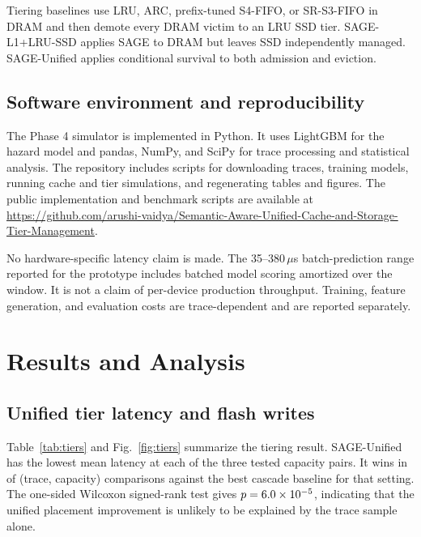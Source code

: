 \documentclass[conference]{IEEEtran}
\newcommand{\us}{\ensuremath{\mu}s}
\begin{document}
Tiering baselines use LRU, ARC, prefix-tuned S4-FIFO, or SR-S3-FIFO in DRAM and then demote every DRAM victim to an LRU SSD tier. SAGE-L1+LRU-SSD applies SAGE to DRAM but leaves SSD independently managed. SAGE-Unified applies conditional survival to both admission and eviction.

\subsection{Software environment and reproducibility}
The Phase 4 simulator is implemented in Python. It uses LightGBM for the hazard model and pandas, NumPy, and SciPy for trace processing and statistical analysis. The repository includes scripts for downloading traces, training models, running cache and tier simulations, and regenerating tables and figures. The public implementation and benchmark scripts are available at
\url{https://github.com/arushi-vaidya/Semantic-Aware-Unified-Cache-and-Storage-Tier-Management}.

No hardware-specific latency claim is made. The 35--380\,\us{} batch-prediction range reported for the prototype includes batched model scoring amortized over the window. It is not a claim of per-device production throughput. Training, feature generation, and evaluation costs are trace-dependent and are reported separately.

\section{Results and Analysis}
\subsection{Unified tier latency and flash writes}
Table~\ref{tab:tiers} and Fig.~\ref{fig:tiers} summarize the tiering result. SAGE-Unified has the lowest mean latency at each of the three tested capacity pairs. It wins in \tierWins{} of \tierN{} (trace, capacity) comparisons against the best cascade baseline for that setting. The one-sided Wilcoxon signed-rank test gives $p=6.0\times 10^{-5}$, indicating that the unified placement improvement is unlikely to be explained by the trace sample alone.

\begin{table}[t]
\centering
\caption{Tiering: mean latency (ms) and SSD writes per 1K requests, averaged over 11 traces, for DRAM/SSD pairs.}
\label{tab:tiers}
\scriptsize
\setlength{\tabcolsep}{3pt}
\resizebox{\columnwidth}{!}{}
\end{table}
\end{document}
